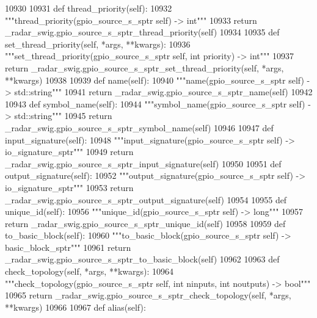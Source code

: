\begin{DoxyCode}
{{{{{{{{{{{{{{{{{{{{{{{{{{{{{{{{{{10930 
10931     \textcolor{keyword}{def }thread_priority(self):
10932         \textcolor{stringliteral}{"""thread\_priority(gpio\_source\_s\_sptr self) -> int"""}
10933         \textcolor{keywordflow}{return} \_radar\_swig.gpio\_source\_s\_sptr\_thread\_priority(self)
10934 
10935     \textcolor{keyword}{def }set_thread_priority(self, *args, **kwargs):
10936         \textcolor{stringliteral}{"""set\_thread\_priority(gpio\_source\_s\_sptr self, int priority) -> int"""}
10937         \textcolor{keywordflow}{return} \_radar\_swig.gpio\_source\_s\_sptr\_set\_thread\_priority(self, *args, **kwargs)
10938 
10939     \textcolor{keyword}{def }name(self):
10940         \textcolor{stringliteral}{"""name(gpio\_source\_s\_sptr self) -> std::string"""}
10941         \textcolor{keywordflow}{return} \_radar\_swig.gpio\_source\_s\_sptr\_name(self)
10942 
10943     \textcolor{keyword}{def }symbol_name(self):
10944         \textcolor{stringliteral}{"""symbol\_name(gpio\_source\_s\_sptr self) -> std::string"""}
10945         \textcolor{keywordflow}{return} \_radar\_swig.gpio\_source\_s\_sptr\_symbol\_name(self)
10946 
10947     \textcolor{keyword}{def }input_signature(self):
10948         \textcolor{stringliteral}{"""input\_signature(gpio\_source\_s\_sptr self) -> io\_signature\_sptr"""}
10949         \textcolor{keywordflow}{return} \_radar\_swig.gpio\_source\_s\_sptr\_input\_signature(self)
10950 
10951     \textcolor{keyword}{def }output_signature(self):
10952         \textcolor{stringliteral}{"""output\_signature(gpio\_source\_s\_sptr self) -> io\_signature\_sptr"""}
10953         \textcolor{keywordflow}{return} \_radar\_swig.gpio\_source\_s\_sptr\_output\_signature(self)
10954 
10955     \textcolor{keyword}{def }unique_id(self):
10956         \textcolor{stringliteral}{"""unique\_id(gpio\_source\_s\_sptr self) -> long"""}
10957         \textcolor{keywordflow}{return} \_radar\_swig.gpio\_source\_s\_sptr\_unique\_id(self)
10958 
10959     \textcolor{keyword}{def }to_basic_block(self):
10960         \textcolor{stringliteral}{"""to\_basic\_block(gpio\_source\_s\_sptr self) -> basic\_block\_sptr"""}
10961         \textcolor{keywordflow}{return} \_radar\_swig.gpio\_source\_s\_sptr\_to\_basic\_block(self)
10962 
10963     \textcolor{keyword}{def }check_topology(self, *args, **kwargs):
10964         \textcolor{stringliteral}{"""check\_topology(gpio\_source\_s\_sptr self, int ninputs, int noutputs) -> bool"""}
10965         \textcolor{keywordflow}{return} \_radar\_swig.gpio\_source\_s\_sptr\_check\_topology(self, *args, **kwargs)
10966 
10967     \textcolor{keyword}{def }alias(self):
}}}}}}}}}}}}}}}}}}}}}}}}}}}}}}}}}}
\end{DoxyCode}
